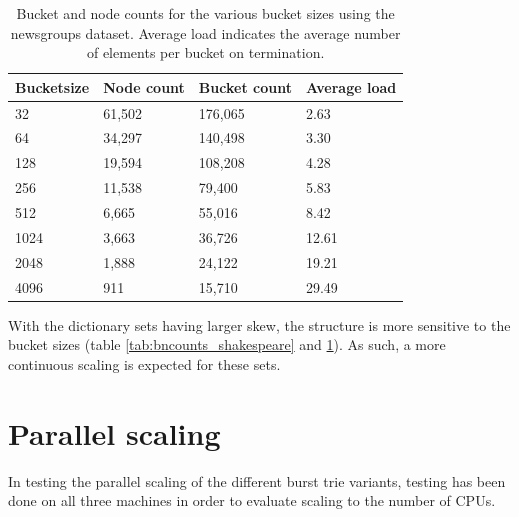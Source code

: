 \begin{table}[h]
    \centering
    \begin{tabular}[here]{ l l l l }
        \hline
        Bucketsize& Node count  & Bucket count & Average load  \\\hline
        32        &  61,502     & 176,065      & 2.63\\
        64        &  34,297     & 140,498      & 3.30\\
        128       &  19,594     & 108,208      & 4.28\\
        256       &  11,538     & 79,400       & 5.83\\
        512       &  6,665      & 55,016       & 8.42\\
        1024      &  3,663      & 36,726       & 12.61\\ 
        2048      &  1,888      & 24,122       & 19.21\\ 
        4096      &  911        & 15,710       & 29.49\\\hline 
    \end{tabular}
    \caption{Bucket and node counts for the various bucket sizes using the
    newsgroups dataset. Average load indicates the average number of elements
    per bucket on termination.}
    \label{tab:bncounts_ngrp}
\end{table}

With the dictionary sets having larger skew, the structure is more sensitive to
the bucket sizes (table \ref{tab:bncounts_shakespeare} and
\ref{tab:bncounts_ngrp}). As such, a more continuous scaling is expected for
these sets.

\clearpage
\section{Parallel scaling}
In testing the parallel scaling of the different burst trie variants,
testing has been done on all three machines in order to evaluate scaling
to the number of CPUs.


